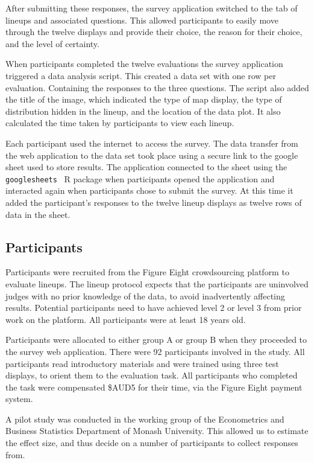 \documentclass[journal]{vgtc}                     %
\begin{document}
After submitting these responses, the survey application switched to the tab of lineups and associated questions. This allowed participants to easily move through the twelve displays and provide their choice, the reason for their choice, and the level of certainty.

When participants completed the twelve evaluations the survey application triggered a data analysis script. This created a data set with one row per evaluation. Containing the responses to the three questions. The script also added the title of the image, which indicated the type of map display, the type of distribution hidden in the lineup, and the location of the data plot. It also calculated the time taken by participants to view each lineup.

Each participant used the internet to access the survey.
The data transfer from the web application to the data set took place using a secure link to the google sheet used to store results. The application connected to the sheet using the \texttt{googlesheets}~\cite{sheets} R package when participants opened the application and interacted again when participants chose to submit the survey. At this time it added the participant's responses to the twelve lineup displays as twelve rows of data in the sheet.

\hypertarget{participants}{%
\subsection{Participants}\label{participants}}

Participants were recruited from the Figure Eight crowdsourcing platform \cite{figeight} to evaluate lineups.
The lineup protocol expects that the participants are uninvolved judges with no prior knowledge of the data, to avoid inadvertently affecting results. Potential participants need to have achieved level 2 or level 3 from prior work on the platform. All participants were at least 18 years old.

Participants were allocated to either group A or group B when they proceeded to the survey web application. There were 92 participants involved in the study. All participants read introductory materials and were trained using three test displays, to orient them to the evaluation task. All participants who completed the task were compensated \$AUD5 for their time, via the Figure Eight payment system.

A pilot study was conducted in the working group of the Econometrics and Business Statistics Department of Monash University. This allowed us to estimate the effect size, and thus decide on a number of participants to collect responses from.
\end{document}
